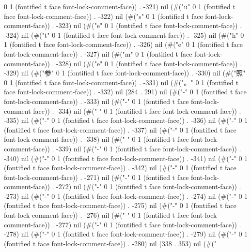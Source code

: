 0 1 (fontified t face font-lock-comment-face)) . -321) nil (#("u" 0 1 (fontified t face font-lock-comment-face)) . -322) nil (#("s" 0 1 (fontified t face font-lock-comment-face)) . -323) nil (#("e" 0 1 (fontified t face font-lock-comment-face)) . -324) nil (#("t" 0 1 (fontified t face font-lock-comment-face)) . -325) nil (#("h" 0 1 (fontified t face font-lock-comment-face)) . -326) nil (#("e" 0 1 (fontified t face font-lock-comment-face)) . -327) nil (#("m" 0 1 (fontified t face font-lock-comment-face)) . -328) nil (#("e" 0 1 (fontified t face font-lock-comment-face)) . -329) nil (#("参" 0 1 (fontified t face font-lock-comment-face)) . -330) nil (#("照" 0 1 (fontified t face font-lock-comment-face)) . -331) nil (#("。" 0 1 (fontified t face font-lock-comment-face)) . -332) nil (284 . 291) nil (#("-" 0 1 (fontified t face font-lock-comment-face)) . -333) nil (#("-" 0 1 (fontified t face font-lock-comment-face)) . -334) nil (#("-" 0 1 (fontified t face font-lock-comment-face)) . -335) nil (#("-" 0 1 (fontified t face font-lock-comment-face)) . -336) nil (#("-" 0 1 (fontified t face font-lock-comment-face)) . -337) nil (#("-" 0 1 (fontified t face font-lock-comment-face)) . -338) nil (#("-" 0 1 (fontified t face font-lock-comment-face)) . -339) nil (#("-" 0 1 (fontified t face font-lock-comment-face)) . -340) nil (#("-" 0 1 (fontified t face font-lock-comment-face)) . -341) nil (#("-" 0 1 (fontified t face font-lock-comment-face)) . -342) nil (#("-" 0 1 (fontified t face font-lock-comment-face)) . -271) nil (#("-" 0 1 (fontified t face font-lock-comment-face)) . -272) nil (#("-" 0 1 (fontified t face font-lock-comment-face)) . -273) nil (#("-" 0 1 (fontified t face font-lock-comment-face)) . -274) nil (#("-" 0 1 (fontified t face font-lock-comment-face)) . -275) nil (#("-" 0 1 (fontified t face font-lock-comment-face)) . -276) nil (#("-" 0 1 (fontified t face font-lock-comment-face)) . -277) nil (#("-" 0 1 (fontified t face font-lock-comment-face)) . -278) nil (#("-" 0 1 (fontified t face font-lock-comment-face)) . -279) nil (#("-" 0 1 (fontified t face font-lock-comment-face)) . -280) nil (338 . 353) nil (#("%